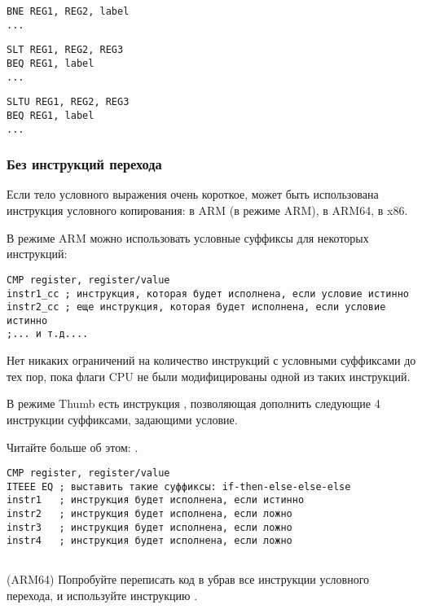 \begin{lstlisting}[caption=Проверка на неравенство,style=customasmMIPS]
BNE REG1, REG2, label
...
\end{lstlisting}

\begin{lstlisting}[caption=Проверка на меньше (знаковое),style=customasmMIPS]
SLT REG1, REG2, REG3
BEQ REG1, label
...
\end{lstlisting}

\begin{lstlisting}[caption=Проверка на меньше (беззнаковое),style=customasmMIPS]
SLTU REG1, REG2, REG3
BEQ REG1, label
...
\end{lstlisting}

\subsubsection{Без инструкций перехода}


Если тело условного выражения очень короткое, может быть
использована инструкция условного копирования:  в ARM (в режиме ARM),  в ARM64,  в x86.


В режиме ARM можно использовать условные суффиксы для некоторых инструкций:

\begin{lstlisting}[caption=ARM (\ARMMode),style=customasmARM]
CMP register, register/value
instr1_cc ; инструкция, которая будет исполнена, если условие истинно
instr2_cc ; еще инструкция, которая будет исполнена, если условие истинно
;... и т.д....
\end{lstlisting}

Нет никаких ограничений на количество инструкций с условными суффиксами до тех пор,
пока флаги CPU не были модифицированы одной из таких инструкций.


В режиме Thumb есть инструкция , позволяющая дополнить следующие 4 инструкции суффиксами, задающими
условие.

Читайте больше об этом: .

\begin{lstlisting}[caption=ARM (\ThumbMode),style=customasmARM]
CMP register, register/value
ITEEE EQ ; выставить такие суффиксы: if-then-else-else-else
instr1   ; инструкция будет исполнена, если истинно
instr2   ; инструкция будет исполнена, если ложно
instr3   ; инструкция будет исполнена, если ложно
instr4   ; инструкция будет исполнена, если ложно
\end{lstlisting}

\subsection{\Exercise}

(ARM64) Попробуйте переписать код в  
убрав все инструкции условного перехода, и используйте инструкцию .

